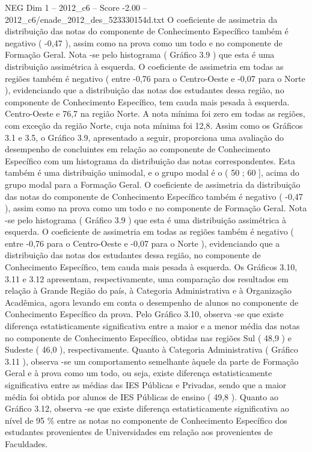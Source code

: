 \begin{textsample}{NEG Dim 1 – 2012\_c6 – Score -2.00 – 2012\_c6/enade\_2012\_des\_523330154d.txt}
O coeficiente de assimetria da distribuição das notas do componente de Conhecimento Específico também é negativo ( -0,47 ), assim como na prova como um todo e no componente de Formação Geral.
Nota -se pelo histograma ( Gráfico 3.9 ) que esta é uma distribuição assimétrica à esquerda.
O coeficiente de assimetria em todas as regiões também é negativo ( entre -0,76 para o Centro-Oeste e -0,07 para o Norte ), evidenciando que a distribuição das notas dos estudantes dessa região, no componente de Conhecimento Específico, tem cauda mais pesada à esquerda.
Centro-Oeste e 76,7 na região Norte.
A nota mínima foi zero em todas as regiões, com exceção da região Norte, cuja nota mínima foi 12,8.
Assim como os Gráficos 3.1 e 3.5, o Gráfico 3.9, apresentado a seguir, proporciona uma avaliação do desempenho de concluintes em relação ao componente de Conhecimento Específico com um histograma da distribuição das notas correspondentes.
Esta também é uma distribuição unimodal, e o grupo modal é o ( 50 ; 60 ], acima do grupo modal para a Formação Geral.
O coeficiente de assimetria da distribuição das notas do componente de Conhecimento Específico também é negativo ( -0,47 ), assim como na prova como um todo e no componente de Formação Geral.
Nota -se pelo histograma ( Gráfico 3.9 ) que esta é uma distribuição assimétrica à esquerda.
O coeficiente de assimetria em todas as regiões também é negativo ( entre -0,76 para o Centro-Oeste e -0,07 para o Norte ), evidenciando que a distribuição das notas dos estudantes dessa região, no componente de Conhecimento Específico, tem cauda mais pesada à esquerda.
Os Gráficos 3.10, 3.11 e 3.12 apresentam, respectivamente, uma comparação dos resultados em relação à Grande Região do país, à Categoria Administrativa e à Organização Acadêmica, agora levando em conta o desempenho de alunos no componente de Conhecimento Específico da prova.
Pelo Gráfico 3.10, observa -se que existe diferença estatisticamente significativa entre a maior e a menor média das notas no componente de Conhecimento Específico, obtidas nas regiões Sul ( 48,9 ) e Sudeste ( 46,0 ), respectivamente.
Quanto à Categoria Administrativa ( Gráfico 3.11 ), observa -se um comportamento semelhante àquele da parte de Formação Geral e à prova como um todo, ou seja, existe diferença estatisticamente significativa entre as médias das IES Públicas e Privadas, sendo que a maior média foi obtida por alunos de IES Públicas de ensino ( 49,8 ).
Quanto ao Gráfico 3.12, observa -se que existe diferença estatisticamente significativa ao nível de 95 \% entre as notas no componente de Conhecimento Específico dos estudantes provenientes de Universidades em relação aos provenientes de Faculdades.

\end{textsample}
